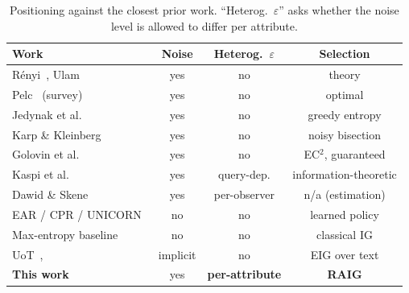 \begin{table}[t]
\caption{Positioning against the closest prior work. ``Heterog.\ $\varepsilon$''
asks whether the noise level is allowed to differ per attribute.}
\label{tab:related}
\centering
\tiny
\begin{tabular}{@{}lccc@{}}
\toprule
\textbf{Work} & \textbf{Noise} & \textbf{Heterog.\ $\varepsilon$} & \textbf{Selection} \\
\midrule
R\'enyi~\cite{renyi1961}, Ulam~\cite{ulam1976} & yes & no & theory \\
Pelc~\cite{pelc2002} (survey) & yes & no & optimal \\
Jedynak et al.~\cite{jedynak2012} & yes & no & greedy entropy \\
Karp \& Kleinberg~\cite{karp2007} & yes & no & noisy bisection \\
Golovin et al.~\cite{golovin2010noisy} & yes & no & EC$^2$, guaranteed \\
Kaspi et al.~\cite{kaspi2018} & yes & query-dep. & information-theoretic \\
Dawid \& Skene~\cite{dawid1979} & yes & per-observer & n/a (estimation) \\
EAR / CPR / UNICORN~\cite{lei2020ear,lei2020cpr,deng2021unicorn} & no & no & learned policy \\
Max-entropy baseline & no & no & classical IG \\
UoT~\cite{hu2024uot}, \cite{mazzaccara2024} & implicit & no & EIG over text \\
\midrule
\textbf{This work} & yes & \textbf{per-attribute} & \textbf{RAIG} \\
\bottomrule
\end{tabular}
\end{table}
